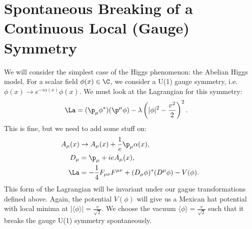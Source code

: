 \documentclass[relqm.tex]{subfiles}
\begin{document}
\section{Spontaneous Breaking of a Continuous Local (Gauge) Symmetry}
We will consider the simplest case of the Higgs phenomenon: the Abelian Higgs model.
For a scalar field $\phi(x)\in\C$, we consider a U(1) gauge symmetry, i.e. $\phi(x)\to e^{-i\alpha(x)}\phi(x)$.
We must look at the Lagrangian for this symmetry:
\begin{align}
    \La &= (\p_\mu\phi^*)(\p^\mu\phi) - \lambda\left(|\phi|^2-\frac{v^2}{2}\right)^2.
\end{align}
This is fine, but we need to add some stuff on:
\begin{align}
    A_\mu(x) &\to A_\mu(x) + \frac{1}{e}\p_\mu\alpha(x), \\
    D_\mu &= \p_\mu + ieA_\mu(x), \\
    \La &= -\frac14 F_{\mu\nu}F^{\mu\nu} + (D_\mu\phi)^*(D^\mu\phi)-V(\phi).
\end{align}
This form of the Lagrangian will be invariant under our gague transformations defined above.
Again, the potential $V(\phi)$ will give us a Mexican hat potential with local minima at $|\langle\phi\rangle|=\frac{v}{\sqrt{2}}$.
We choose the vacuum $\langle\phi\rangle=\frac{v}{\sqrt{2}}$ such that it breaks the gauge U(1) symmetry spontaneously.
\end{document}
